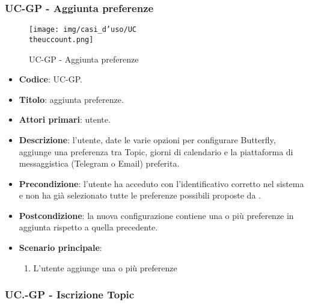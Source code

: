 \subsubsection{UC\theuccount-GP - Aggiunta preferenze}
		\begin{figure}[H]
			\centering
				\texttt{[image: img/casi\_d'uso/UC\\theuccount.png]}\\
			\caption{UC\theuccount-GP - Aggiunta preferenze}
		\end{figure}
	\begin{itemize}
		\item \textbf{Codice}: UC\theuccount-GP.
		\item \textbf{Titolo}: aggiunta preferenze.
		\item \textbf{Attori primari}: utente.
		\item \textbf{Descrizione}: l’utente, date le varie opzioni per configurare Butterfly, aggiunge una
		preferenza tra Topic, giorni di calendario e la piattaforma di messaggistica (Telegram o Email) preferita.
		\item \textbf{Precondizione}: l’utente ha acceduto con l'identificativo corretto nel sistema e non ha già selezionato tutte le preferenze possibili proposte da \progetto.
		\item \textbf{Postcondizione}: la nuova configurazione contiene una o più preferenze in aggiunta rispetto a quella precedente.
		\item \textbf{Scenario principale}:
		\begin{enumerate}
			\item L'utente aggiunge una o più preferenze
		\end{enumerate}
	\end{itemize}

	\subsubsection{UC\theuccount.\thesubuccount-GP - Iscrizione Topic}

